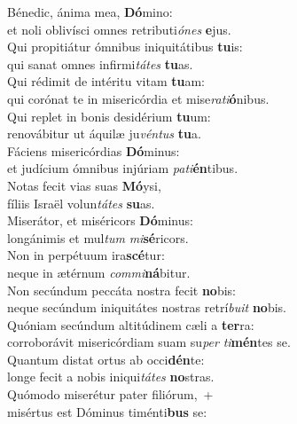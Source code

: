 \evenverse Bénedic, ánima mea, \textbf{Dó}mino:~\*\\
\evenverse et noli oblivísci omnes retributi\textit{ó}\textit{nes} \textbf{e}jus.\\
\oddverse Qui propitiátur ómnibus iniquitátibus \textbf{tu}is:~\*\\
\oddverse qui sanat omnes infirmi\textit{tá}\textit{tes} \textbf{tu}as.\\
\evenverse Qui rédimit de intéritu vitam \textbf{tu}am:~\*\\
\evenverse qui corónat te in misericórdia et mise\textit{ra}\textit{ti}\textbf{ó}nibus.\\
\oddverse Qui replet in bonis desidérium \textbf{tu}um:~\*\\
\oddverse renovábitur ut áquilæ ju\textit{vén}\textit{tus} \textbf{tu}a.\\
\evenverse Fáciens misericórdias \textbf{Dó}minus:~\*\\
\evenverse et judícium ómnibus injúriam \textit{pa}\textit{ti}\textbf{én}tibus.\\
\oddverse Notas fecit vias suas \textbf{Mó}ysi,~\*\\
\oddverse fíliis Israël volun\textit{tá}\textit{tes} \textbf{su}as.\\
\evenverse Miserátor, et miséricors \textbf{Dó}minus:~\*\\
\evenverse longánimis et mul\textit{tum} \textit{mi}\textbf{sé}ricors.\\
\oddverse Non in perpétuum ira\textbf{scé}tur:~\*\\
\oddverse neque in ætérnum \textit{com}\textit{mi}\textbf{ná}bitur.\\
\evenverse Non secúndum peccáta nostra fecit \textbf{no}bis:~\*\\
\evenverse neque secúndum iniquitátes nostras retrí\textit{bu}\textit{it} \textbf{no}bis.\\
\oddverse Quóniam secúndum altitúdinem cæli a \textbf{ter}ra:~\*\\
\oddverse corroborávit misericórdiam suam su\textit{per} \textit{ti}\textbf{mén}tes se.\\
\evenverse Quantum distat ortus ab occi\textbf{dén}te:~\*\\
\evenverse longe fecit a nobis iniqui\textit{tá}\textit{tes} \textbf{no}stras.\\
\oddverse Quómodo miserétur pater filiórum,~+\\
\oddverse  misértus est Dóminus timénti\textbf{bus} se:~\*\\
